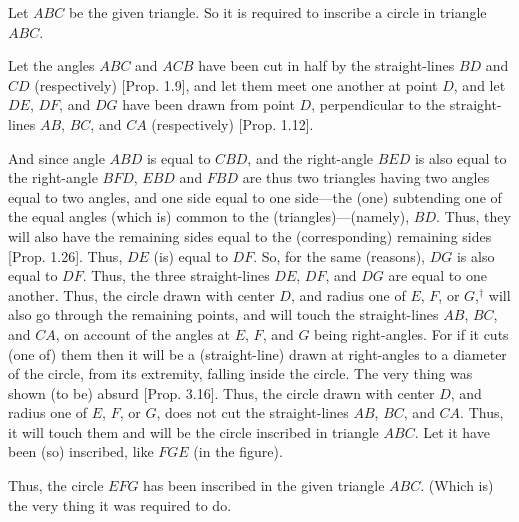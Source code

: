 \begin{Parallel}{}{}
{\epsfysize=2in
\centerline{}

Let $ABC$ be the given triangle. So it is required to inscribe
a circle in triangle $ABC$.

Let the angles $ABC$ and $ACB$ have been cut in half by the
straight-lines $BD$ and $CD$ (respectively) [Prop. 1.9], and let them meet one another
at point $D$, and let $DE$, $DF$, and $DG$ have been drawn from
point $D$, perpendicular to the straight-lines $AB$, $BC$, and $CA$ (respectively) [Prop. 1.12].

And since angle $ABD$ is equal to $CBD$, and the right-angle
$BED$ is also equal to the right-angle $BFD$, $EBD$ and $FBD$ are thus two triangles
having two angles equal to two angles, and one side equal to one side---the
(one) subtending one of the equal angles (which is) common to the (triangles)---(namely), $BD$. Thus, they will also have the 
remaining sides equal to the (corresponding) remaining sides [Prop. 1.26]. Thus, $DE$ (is)
equal to $DF$. So, for the same (reasons), $DG$ is also equal
to $DF$. Thus, the three straight-lines $DE$, $DF$, and $DG$ are equal to one another.
Thus, the circle drawn with center $D$, and radius one of $E$, $F$, or $G$,$^\dag$ will also
go through the remaining points, and will  touch the straight-lines $AB$, $BC$, and $CA$, on account of the angles at $E$, $F$, and $G$ being right-angles. For if it cuts (one of) them then it will be a (straight-line)
drawn at right-angles to a diameter of the circle, from its extremity, falling inside
the circle. The very thing was shown (to be) absurd [Prop. 3.16].
Thus, the circle drawn with center $D$, and radius one of $E$, $F$, or $G$,
does not cut the straight-lines $AB$, $BC$, and $CA$. Thus, it will
touch them and will be the circle inscribed  in triangle $ABC$.
Let it have been (so) inscribed, like $FGE$ (in the figure).

Thus, the circle $EFG$ has been inscribed in the given triangle $ABC$.
(Which is) the very thing it was required to do.}
\end{Parallel}


\vspace{7pt}{\footnotesize \noindent$^\dag$ Here, and in the following propositions, it
is understood that the radius is actually one of $DE$, $DF$, or $DG$.} 

